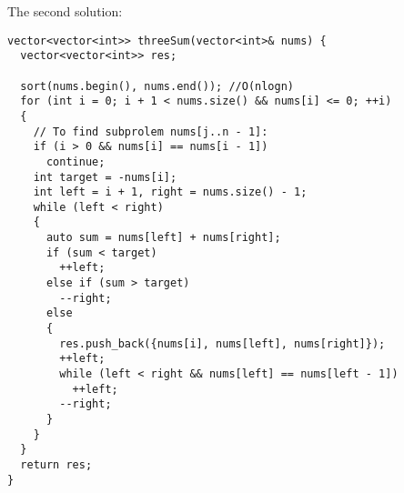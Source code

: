 \documentclass{book}
\begin{document}
	The second solution:
	\begin{lstlisting}
vector<vector<int>> threeSum(vector<int>& nums) {
  vector<vector<int>> res;
  
  sort(nums.begin(), nums.end()); //O(nlogn)        
  for (int i = 0; i + 1 < nums.size() && nums[i] <= 0; ++i)
  {
    // To find subprolem nums[j..n - 1]:
    if (i > 0 && nums[i] == nums[i - 1])
      continue;
    int target = -nums[i];
    int left = i + 1, right = nums.size() - 1;
    while (left < right)
    {            
      auto sum = nums[left] + nums[right];
      if (sum < target)
        ++left;
      else if (sum > target)
        --right;
      else
      {
        res.push_back({nums[i], nums[left], nums[right]});
        ++left;
        while (left < right && nums[left] == nums[left - 1])
          ++left;
        --right;
      }
    }
  }
  return res;
}
	\end{lstlisting}
\end{document}

